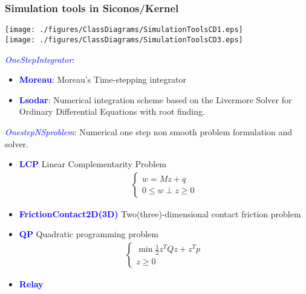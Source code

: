 \frame
{
\frametitle{Simulation tools in Siconos/Kernel}
  \begin{center}
     \texttt{[image: ./figures/ClassDiagrams/SimulationToolsCD1.eps]}\\
\pause
\vspace{0.5cm}
    \texttt{[image: ./figures/ClassDiagrams/SimulationToolsCD3.eps]}
\end{center}
\vspace{0.5cm}
}
\frame
{
  \textcolor{blue}{\textit{OneStepIntegrator}}:
  \begin{itemize}
  \item \textcolor{blue}{\textbf{Moreau}}:  Moreau's Time-stepping integrator      
  \item \textcolor{blue}{\textbf{Lsodar}}:  Numerical integration scheme based on the Livermore Solver for Ordinary Differential Equations with root finding.
  \end{itemize}
  \vspace{1cm}
  \textcolor{blue}{\textit{OnestepNSproblem}}:  Numerical one step non smooth problem formulation and solver.
  \begin{itemize}
  \item \textcolor{blue}{\textbf{LCP}} Linear Complementarity Problem
    \begin{eqnarray*}
      \begin{cases}
        w=Mz+q \\
        0 \leq w \perp z\geq 0
      \end{cases}
    \end{eqnarray*}
  \item \textcolor{blue}{\textbf{FrictionContact2D(3D)}}  Two(three)-dimensional contact friction problem
  \item \textcolor{blue}{\textbf{QP}} Quadratic programming problem
    \begin{eqnarray*}
      \begin{cases} 
        \min  \frac{1}{2}z^T Q z+z^Tp \\
        z \geq 0
      \end{cases}
    \end{eqnarray*}
  \item \textcolor{blue}{\textbf{Relay}}  
  \end{itemize}
}
\frame
